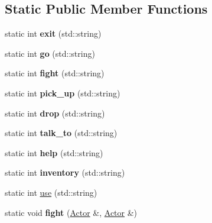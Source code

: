 \subsection*{Static Public Member Functions}
\begin{DoxyCompactItemize}
\item 
\hypertarget{classda__game_1_1GameCommands_af9378fbac0e9fd15ad39324343f2dd0d}{
static int {\bfseries exit} (std::string)}
\label{classda__game_1_1GameCommands_af9378fbac0e9fd15ad39324343f2dd0d}

\item 
\hypertarget{classda__game_1_1GameCommands_aaca98ea05bd6ecf9671e471a3bd363c7}{
static int {\bfseries go} (std::string)}
\label{classda__game_1_1GameCommands_aaca98ea05bd6ecf9671e471a3bd363c7}

\item 
\hypertarget{classda__game_1_1GameCommands_ad8996732daf4abe8fe1ebebafae2a8de}{
static int {\bfseries fight} (std::string)}
\label{classda__game_1_1GameCommands_ad8996732daf4abe8fe1ebebafae2a8de}

\item 
\hypertarget{classda__game_1_1GameCommands_a8cc72ac921cc6e3a4d95b536e13c03fa}{
static int {\bfseries pick\_\-up} (std::string)}
\label{classda__game_1_1GameCommands_a8cc72ac921cc6e3a4d95b536e13c03fa}

\item 
\hypertarget{classda__game_1_1GameCommands_ae833ca20e0d8171719a70217e990a57c}{
static int {\bfseries drop} (std::string)}
\label{classda__game_1_1GameCommands_ae833ca20e0d8171719a70217e990a57c}

\item 
\hypertarget{classda__game_1_1GameCommands_aa73274bc09851571eaa234a50715624d}{
static int {\bfseries talk\_\-to} (std::string)}
\label{classda__game_1_1GameCommands_aa73274bc09851571eaa234a50715624d}

\item 
\hypertarget{classda__game_1_1GameCommands_a909164da2918f7a7a68fca6c6b698888}{
static int {\bfseries help} (std::string)}
\label{classda__game_1_1GameCommands_a909164da2918f7a7a68fca6c6b698888}

\item 
\hypertarget{classda__game_1_1GameCommands_a49e051175d1bfc13b00c0580e57b07fc}{
static int {\bfseries inventory} (std::string)}
\label{classda__game_1_1GameCommands_a49e051175d1bfc13b00c0580e57b07fc}

\item 
static int \hyperlink{classda__game_1_1GameCommands_a3885d4f3da832d4c06c46f2ad4d14013}{use} (std::string)
\item 
\hypertarget{classda__game_1_1GameCommands_a13f16df34b86dfaf6f21fde3395f356f}{
static void {\bfseries fight} (\hyperlink{classda__game_1_1Actor}{Actor} \&, \hyperlink{classda__game_1_1Actor}{Actor} \&)}
\label{classda__game_1_1GameCommands_a13f16df34b86dfaf6f21fde3395f356f}

\end{DoxyCompactItemize}


